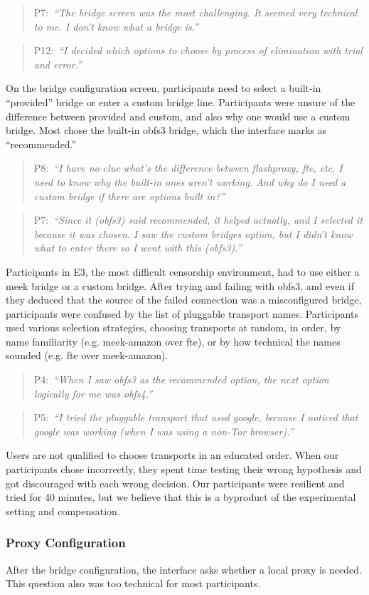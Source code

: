 \documentclass[USenglish,oneside,twocolumn]{article}
\newcommand{\pquote}[2]{
\begin{quotation}
\noindent #1:~\textit{``#2''}
\end{quotation}
}
\begin{document}
\pquote{P7}{The bridge screen was the most challenging. It seemed very technical to me. I don't know what a bridge is.}
\pquote{P12}{I decided which options to choose by process of elimination with trial and error.}

On the bridge configuration screen, participants need to select a built-in ``provided'' bridge or enter a custom bridge line. Participants were unsure of the difference between provided and custom, and also why one would use a custom bridge. Most chose the built-in obfs3 bridge, which the interface marks as ``recommended.''

\pquote{P8}{I have no clue what's the difference between flashproxy, fte, etc. I need to know why the built-in ones aren't working. And why do I need a custom bridge if there are options built in?}
\pquote{P7}{Since it (obfs3) said recommended, it helped actually, and I selected it because it was chosen. I saw the custom bridges option, but I didn't know what to enter there so I went with this (obfs3).}

Participants in E3, the most difficult censorship environment, had to use either a meek bridge or a custom bridge. After trying and failing with obfs3, and even if they deduced that the source of the failed connection was a misconfigured bridge, participants were confused by the list of pluggable transport names. Participants used various selection strategies, choosing transports at random, in order, by name familiarity (e.g. meek-amazon over fte), or by how technical the names sounded (e.g. fte over meek-amazon). 

\pquote{P4}{When I saw obfs3 as the recommended option, the next option logically for me was obfs4.}
\pquote{P5}{I tried the pluggable transport that used google, because I noticed that google was working (when I was using a non-Tor browser).}

Users are not qualified to choose transports in an educated order. When our participants chose incorrectly, they spent time testing their wrong hypothesis and got discouraged with each wrong decision. Our participants were resilient and tried for 40 minutes, but we believe that this is a byproduct of the experimental setting and compensation.

\subsubsection{Proxy Configuration} 
After the bridge configuration, the interface asks whether a local proxy is needed. This question also was too technical for most participants.
\end{document}
